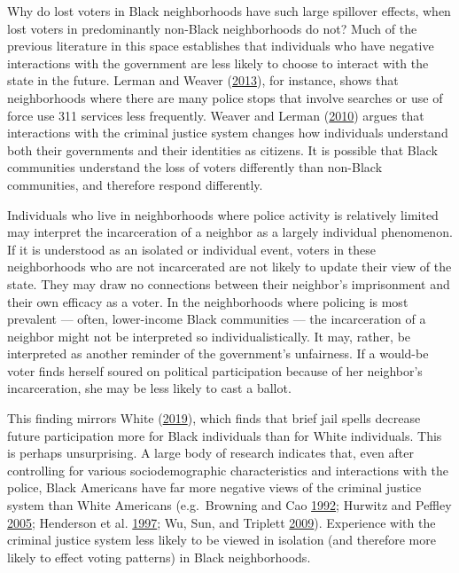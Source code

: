 \documentclass[]{article}
\begin{document}
Why do lost voters in Black neighborhoods have such large spillover effects, when lost voters in predominantly non-Black neighborhoods do not? Much of the previous literature in this space establishes that individuals who have negative interactions with the government are less likely to choose to interact with the state in the future. Lerman and Weaver (\protect\hyperlink{ref-Lerman2013}{2013}), for instance, shows that neighborhoods where there are many police stops that involve searches or use of force use 311 services less frequently. Weaver and Lerman (\protect\hyperlink{ref-Weaver2010}{2010}) argues that interactions with the criminal justice system changes how individuals understand both their governments and their identities as citizens. It is possible that Black communities understand the loss of voters differently than non-Black communities, and therefore respond differently.

Individuals who live in neighborhoods where police activity is relatively limited may interpret the incarceration of a neighbor as a largely individual phenomenon. If it is understood as an isolated or individual event, voters in these neighborhoods who are not incarcerated are not likely to update their view of the state. They may draw no connections between their neighbor's imprisonment and their own efficacy as a voter. In the neighborhoods where policing is most prevalent --- often, lower-income Black communities --- the incarceration of a neighbor might not be interpreted so individualistically. It may, rather, be interpreted as another reminder of the government's unfairness. If a would-be voter finds herself soured on political participation because of her neighbor's incarceration, she may be less likely to cast a ballot.

This finding mirrors White (\protect\hyperlink{ref-White2019}{2019}), which finds that brief jail spells decrease future participation more for Black individuals than for White individuals. This is perhaps unsurprising. A large body of research indicates that, even after controlling for various sociodemographic characteristics and interactions with the police, Black Americans have far more negative views of the criminal justice system than White Americans (e.g.~Browning and Cao \protect\hyperlink{ref-Browning1992}{1992}; Hurwitz and Peffley \protect\hyperlink{ref-Hurwitz2005}{2005}; Henderson et al. \protect\hyperlink{ref-Henderson1997}{1997}; Wu, Sun, and Triplett \protect\hyperlink{ref-Wu2009}{2009}). Experience with the criminal justice system less likely to be viewed in isolation (and therefore more likely to effect voting patterns) in Black neighborhoods.
\end{document}
